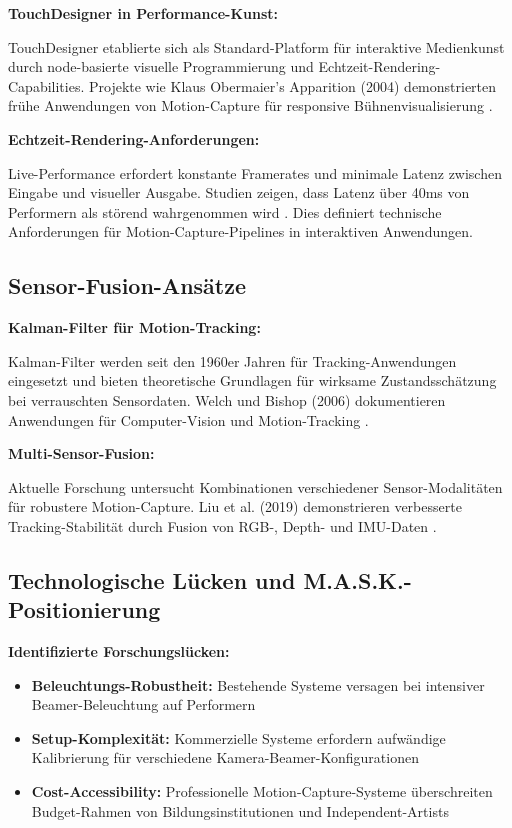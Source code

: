 \textbf{TouchDesigner in Performance-Kunst:}

TouchDesigner etablierte sich als Standard-Platform für interaktive Medienkunst durch node-basierte visuelle Programmierung und Echtzeit-Rendering-Capabilities. Projekte wie Klaus Obermaier's \glqq Apparition\grqq{} (2004) demonstrierten frühe Anwendungen von Motion-Capture für responsive Bühnenvisualisierung \cite{obermaier2004apparition}.

\textbf{Echtzeit-Rendering-Anforderungen:}

Live-Performance erfordert konstante Framerates und minimale Latenz zwischen Eingabe und visueller Ausgabe. Studien zeigen, dass Latenz über 40ms von Performern als störend wahrgenommen wird \cite{flach2004latency}. Dies definiert technische Anforderungen für Motion-Capture-Pipelines in interaktiven Anwendungen.

\subsection{Sensor-Fusion-Ansätze}

\textbf{Kalman-Filter für Motion-Tracking:}

Kalman-Filter werden seit den 1960er Jahren für Tracking-Anwendungen eingesetzt und bieten theoretische Grundlagen für wirksame Zustandsschätzung bei verrauschten Sensordaten. Welch und Bishop (2006) dokumentieren Anwendungen für Computer-Vision und Motion-Tracking \cite{welch2006kalman}.

\textbf{Multi-Sensor-Fusion:}

Aktuelle Forschung untersucht Kombinationen verschiedener Sensor-Modalitäten für robustere Motion-Capture. Liu et al. (2019) demonstrieren verbesserte Tracking-Stabilität durch Fusion von RGB-, Depth- und IMU-Daten \cite{liu2019multimodal}.

\subsection{Technologische Lücken und M.A.S.K.-Positionierung}

\textbf{Identifizierte Forschungslücken:}

\begin{itemize}
    \item \textbf{Beleuchtungs-Robustheit:} Bestehende Systeme versagen bei intensiver Beamer-Beleuchtung auf Performern
    \item \textbf{Setup-Komplexität:} Kommerzielle Systeme erfordern aufwändige Kalibrierung für verschiedene Kamera-Beamer-Konfigurationen
    \item \textbf{Cost-Accessibility:} Professionelle Motion-Capture-Systeme überschreiten Budget-Rahmen von Bildungsinstitutionen und Independent-Artists
\end{itemize}

